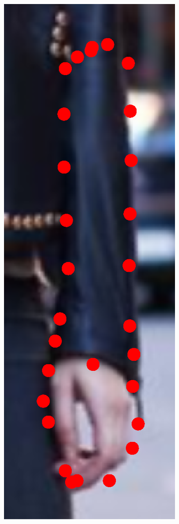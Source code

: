 \begin{figure}[!t]
    \hfill
    \includegraphics[height=\ofh]{resources/Annotation_Correction/Fittings/38.eps}
    \hfill

\end{figure}
